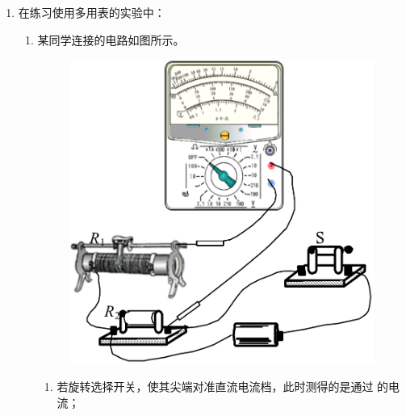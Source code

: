 \begin{enumerate}
\begin{enumerate}
\end{enumerate}



\item
{}
在练习使用多用表的实验中：
\begin{enumerate}
\item
某同学连接的电路如图所示。
\begin{figure}[h!]
\centering
\includegraphics[width=0.5\linewidth]{picture/screenshot060}
\end{figure}

\begin{enumerate}
\item
若旋转选择开关，使其尖端对准直流电流档，此时测得的是通过 \underlinegap 的电流；


\end{enumerate}
\end{enumerate}
\end{enumerate}
